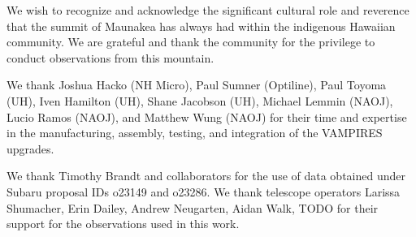 \begin{acknowledgements}
We wish to recognize and acknowledge the significant cultural role and reverence that the summit of Maunakea has always had within the indigenous Hawaiian community. We are grateful and thank the community for the privilege to conduct observations from this mountain.

We thank Joshua Hacko (NH Micro), Paul Sumner (Optiline), Paul Toyoma (UH), Iven Hamilton (UH), Shane Jacobson (UH), Michael Lemmin (NAOJ), Lucio Ramos (NAOJ), and Matthew Wung (NAOJ) for their time and expertise in the manufacturing, assembly, testing, and integration of the VAMPIRES upgrades.

We thank Timothy Brandt and collaborators for the use of data obtained under Subaru proposal IDs o23149 and o23286. We thank telescope operators Larissa Shumacher, Erin Dailey, Andrew Neugarten, Aidan Walk, TODO for their support for the observations used in this work.
\end{acknowledgements}